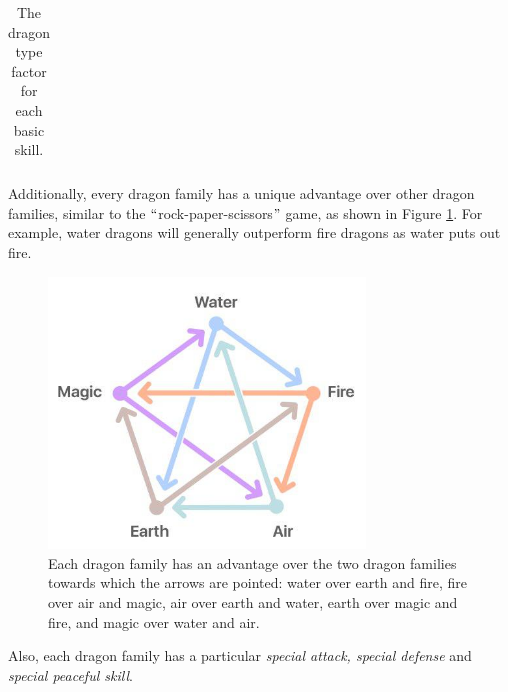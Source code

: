 \documentclass[12pt]{article}
\begin{document}
\begin{table}[!ht]
\begin{tabular}{p{0.84in}p{0.84in}p{0.84in}p{0.84in}p{0.84in}p{0.84in}}
\end{tabular}\caption{The dragon type factor for each basic skill.}
\label{tab:The dragon type factor for each basic skill.}

 \end{table}



Additionally, every dragon family has a unique advantage over other dragon families, similar to the $``$rock-paper-scissors$"$  game, as shown in Figure \ref{fig:Fire}. For example, water dragons will generally outperform fire dragons as water puts out fire.\par




\begin{figure}[!ht]
	\begin{Center}
		\includegraphics[width=3.32in,height=2.84in]{./media/image22.jpg}
		\caption{Each dragon family has an advantage over the two dragon families towards which the arrows are pointed: water over earth and fire, fire over air and magic, air over earth and water, earth over magic and fire, and magic over water and air.} 
		\label{fig:Fire}
	\end{Center}
\end{figure}



\par

Also, each dragon family has a particular \textit{special attack, special defense} and \textit{special peaceful skill}.\par
\end{document}
